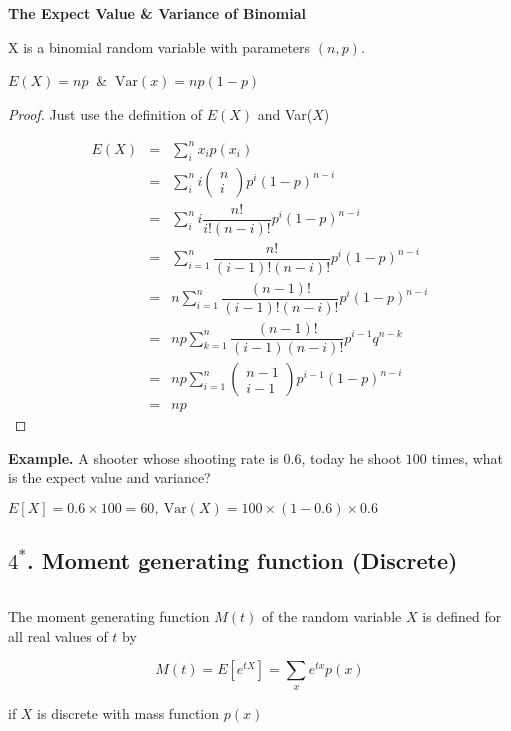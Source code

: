 \newpage

\textbf{The Expect Value \& Variance of Binomial}
$ $

X is a binomial random variable with parameters $(n,p)$.

\begin{center}
	$E(X) = np~$ \& $~\text{Var}(x) = np(1-p)$
\end{center}

\begin{proof}
	Just use the definition of $E(X)$ and Var($X$)
	
	\begin{eqnarray*}
		E(X) &=& \sum_i^n x_ip(x_i)\\
		&=& \sum_i^n i \left(\begin{matrix}
		n \\ i
	\end{matrix}\right) p^i(1 - p)^{n-i}\\
	&=& \sum^n_i i\dfrac{n!}{i!(n-i)!}p^i(1-p)^{n-i}\\
	&=& \sum^n_{i=1}\dfrac{n!}{(i-1)!(n-i)!}p^i(1-p)^{n-i}\\
	&=& n\sum^n_{i=1} \dfrac{(n-1)!}{(i-1)!(n-i)!}p^i(1-p)^{n-i}\\
	&=& np\sum^n_{k=1}\dfrac{(n-1)!}{(i-1)(n-i)!}p^{i-1}q^{n-k}\\
	&=& np\sum^n_{i=1}\left(\begin{matrix}
		n-1 \\ i-1
	\end{matrix}\right)p^{i-1}(1-p)^{n-i}\\
	&=& np
	\end{eqnarray*}
\end{proof}

\textbf{Example.} A shooter whose shooting rate is $0.6$, today he shoot $100$ times, what is the expect value and variance?

\begin{solution}
	$E[X] = 0.6 \times 100 = 60,~\text{Var}(X) = 100 \times (1-0.6) \times 0.6$
\end{solution}






\newpage

\subsection*{$\text{4}^*$. Moment generating function (Discrete)}$ $

\begin{defn}
	The moment generating function $M(t)$ of the random variable $X$ is defined for all real values of $t$ by 
	
	$$M(t) = E\left[e^{tX}\right] = \sum_x e^{tx}p(x)$$
	
	if $X$ is discrete with mass function $p(x)$
\end{defn}

